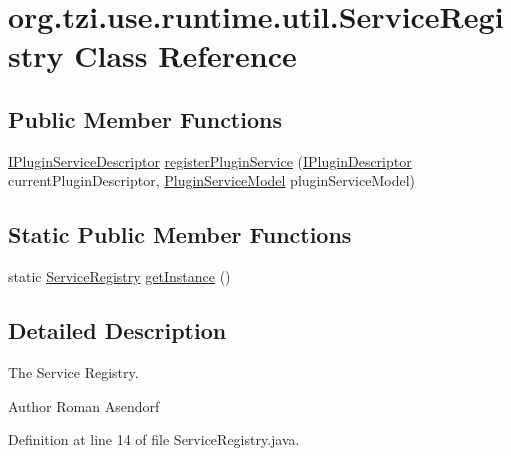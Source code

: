 \hypertarget{classorg_1_1tzi_1_1use_1_1runtime_1_1util_1_1_service_registry}{\section{org.\-tzi.\-use.\-runtime.\-util.\-Service\-Registry Class Reference}
\label{classorg_1_1tzi_1_1use_1_1runtime_1_1util_1_1_service_registry}
}
\subsection*{Public Member Functions}
\begin{DoxyCompactItemize}
\item 
\hyperlink{interfaceorg_1_1tzi_1_1use_1_1runtime_1_1service_1_1_i_plugin_service_descriptor}{I\-Plugin\-Service\-Descriptor} \hyperlink{classorg_1_1tzi_1_1use_1_1runtime_1_1util_1_1_service_registry_a5d314a6e327f45416be87ce4fe4cd1fc}{register\-Plugin\-Service} (\hyperlink{interfaceorg_1_1tzi_1_1use_1_1runtime_1_1_i_plugin_descriptor}{I\-Plugin\-Descriptor} current\-Plugin\-Descriptor, \hyperlink{classorg_1_1tzi_1_1use_1_1runtime_1_1model_1_1_plugin_service_model}{Plugin\-Service\-Model} plugin\-Service\-Model)
\end{DoxyCompactItemize}
\subsection*{Static Public Member Functions}
\begin{DoxyCompactItemize}
\item 
static \hyperlink{classorg_1_1tzi_1_1use_1_1runtime_1_1util_1_1_service_registry}{Service\-Registry} \hyperlink{classorg_1_1tzi_1_1use_1_1runtime_1_1util_1_1_service_registry_a960a123c7e36f3aa1c815acce2664cb2}{get\-Instance} ()
\end{DoxyCompactItemize}


\subsection{Detailed Description}
The Service Registry.

\begin{DoxyAuthor}{Author}
Roman Asendorf 
\end{DoxyAuthor}


Definition at line 14 of file Service\-Registry.\-java.



